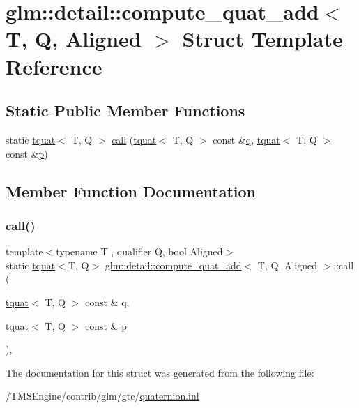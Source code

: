 \hypertarget{structglm_1_1detail_1_1compute__quat__add}{}\section{glm\+:\+:detail\+:\+:compute\+\_\+quat\+\_\+add$<$ T, Q, Aligned $>$ Struct Template Reference}
\label{structglm_1_1detail_1_1compute__quat__add}
\subsection*{Static Public Member Functions}
\begin{DoxyCompactItemize}
\item 
static \hyperlink{structglm_1_1tquat}{tquat}$<$ T, Q $>$ \hyperlink{structglm_1_1detail_1_1compute__quat__add_a4e1737f5ba100ef22f3a9ce9b5c9ea39}{call} (\hyperlink{structglm_1_1tquat}{tquat}$<$ T, Q $>$ const \&\hyperlink{_s_d_l__opengl_8h_a8fc1e7b9baaae687804c7eed46ca09c6}{q}, \hyperlink{structglm_1_1tquat}{tquat}$<$ T, Q $>$ const \&\hyperlink{_s_d_l__opengl__glext_8h_aa5367c14d90f462230c2611b81b41d23}{p})
\end{DoxyCompactItemize}


\subsection{Member Function Documentation}
\mbox{\label{structglm_1_1detail_1_1compute__quat__add_a4e1737f5ba100ef22f3a9ce9b5c9ea39}} 
\subsubsection{\texorpdfstring{call()}{call()}}
{\footnotesize\ttfamily template$<$typename T , qualifier Q, bool Aligned$>$ \\
static \hyperlink{structglm_1_1tquat}{tquat}$<$T, Q$>$ \hyperlink{structglm_1_1detail_1_1compute__quat__add}{glm\+::detail\+::compute\+\_\+quat\+\_\+add}$<$ T, Q, Aligned $>$\+::call (\begin{DoxyParamCaption}\item[{\hyperlink{structglm_1_1tquat}{tquat}$<$ T, Q $>$ const \&}]{q,  }\item[{\hyperlink{structglm_1_1tquat}{tquat}$<$ T, Q $>$ const \&}]{p }\end{DoxyParamCaption})\hspace{0.3cm}{\ttfamily [inline]}, {\ttfamily [static]}}



The documentation for this struct was generated from the following file\+:\begin{DoxyCompactItemize}
\item 
/\+T\+M\+S\+Engine/contrib/glm/gtc/\hyperlink{gtc_2quaternion_8inl}{quaternion.\+inl}\end{DoxyCompactItemize}
